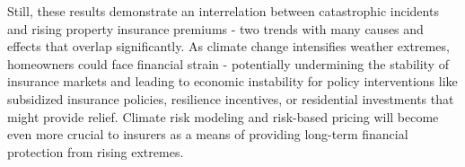 \documentclass[12pt]{article}
\begin{document}
Still, these results demonstrate an interrelation between catastrophic incidents and rising property insurance premiums - two trends 
with many causes and effects that overlap significantly. As climate change intensifies weather extremes, homeowners could face 
financial strain - potentially undermining the stability of insurance markets and leading to economic instability for policy 
interventions like subsidized insurance policies\cite{iii}, resilience incentives, or residential investments\cite{kousky} that 
might provide relief. Climate risk modeling and risk-based pricing will become even more crucial to insurers as a means of providing 
long-term financial protection from rising extremes.






\end{document}
